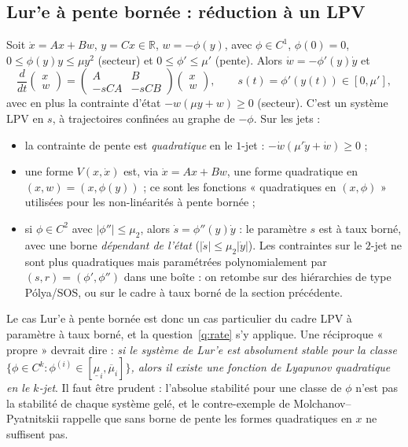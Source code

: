 \documentclass[11pt,a4paper]{article}
\theoremstyle{definition}
\theoremstyle{remark}
\newcommand{\R}{\mathbb{R}}
\begin{document}
\subsection{Lur'e à pente bornée : réduction à un LPV}
Soit $\dot x = Ax + Bw$, $y=Cx\in\R$, $w = -\phi(y)$, avec $\phi\in C^1$, $\phi(0)=0$, $0\le\phi(y)y\le\mu y^2$ (secteur) et $0\le\phi'\le\mu'$ (pente). Alors $\dot w = -\phi'(y)\dot y$ et
\begin{equation}\label{eq:LPV}
\frac{d}{dt}\begin{pmatrix}x\\w\end{pmatrix} = \begin{pmatrix}A&B\\-sCA&-sCB\end{pmatrix}\begin{pmatrix}x\\w\end{pmatrix},\qquad s(t) = \phi'(y(t))\in[0,\mu'],
\end{equation}
avec en plus la contrainte d'état $-w(\mu y+w)\ge 0$ (secteur). C'est un système LPV en $s$, à trajectoires confinées au graphe de $-\phi$. Sur les jets :
\begin{itemize}[nosep]
\item la contrainte de pente est \emph{quadratique} en le $1$-jet : $-\dot w(\mu'\dot y+\dot w)\ge 0$ ;
\item une forme $V(x,\dot x)$ est, via $\dot x = Ax+Bw$, une forme quadratique en $(x,w) = (x,\phi(y))$ ; ce sont les fonctions « quadratiques en $(x,\phi)$ » utilisées pour les non-linéarités à pente bornée \cite{VDD} ;
\item si $\phi\in C^2$ avec $|\phi''|\le\mu_2$, alors $\dot s = \phi''(y)\dot y$ : le paramètre $s$ est à taux borné, avec une borne \emph{dépendant de l'état} ($|\dot s|\le\mu_2|\dot y|$). Les contraintes sur le $2$-jet ne sont plus quadratiques mais paramétrées polynomialement par $(s,r) = (\phi',\phi'')$ dans une boîte : on retombe sur des hiérarchies de type Pólya/SOS, ou sur le cadre à taux borné de la section précédente.
\end{itemize}
Le cas Lur'e à pente bornée est donc un cas particulier du cadre LPV à paramètre à taux borné, et la question~\ref{q:rate} s'y applique. Une réciproque « propre » devrait dire : \emph{si le système de Lur'e est absolument stable pour la classe $\{\phi\in C^k : \phi^{(i)}\in[\underline\mu_i,\overline\mu_i]\}$, alors il existe une fonction de Lyapunov quadratique en le $k$-jet}. Il faut être prudent : l'absolue stabilité pour une classe de $\phi$ n'est pas la stabilité de chaque système gelé, et le contre-exemple de Molchanov–Pyatnitskii rappelle que sans borne de pente les formes quadratiques en $x$ ne suffisent pas.
\end{document}
